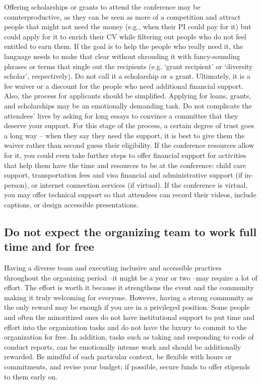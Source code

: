 \documentclass[10pt,letterpaper]{article}
\begin{document}
Offering scholarships or grants to attend the conference may be counterproductive, as they can be seen as more of a competition and attract people that might not need the money (e.g., when their PI could pay for it) but could apply for it to enrich their CV while filtering out people who do not feel entitled to earn them. If the goal is to help the people who really need it, the language needs to make that clear without shrouding it with fancy-sounding phrases or terms that single out the recipients (e.g. `grant recipient' or `diversity scholar', respectively). Do not call it a scholarship or a grant. Ultimately, it is a fee waiver or a discount for the people who need additional financial support. Also, the process for applicants should be simplified. Applying for loans, grants, and scholarships may be an emotionally demanding task. Do not complicate the attendees' lives by asking for long essays to convince a committee that they deserve your support. For this stage of the process, a certain degree of trust goes a long way -- when they say they need the support, it is best to give them the waiver rather than second guess their eligibility. If the conference resources allow for it, you could even take further steps to offer financial support for activities that help them have the time and resources to be at the conference: child care support, transportation fees and visa financial and administrative support (if in-person), or internet connection services (if virtual). If the conference is virtual, you may offer technical support so that attendees can record their videos, include captions, or design accessible presentations.

\subsection{Do not expect the organizing team to work full time and for free}
\label{rule_pay_team}
Having a diverse team and executing inclusive and accessible practices throughout the organizing period --it might be a year or two --may require a lot of effort. The effort is worth it because it strengthens the event and the community making it truly welcoming for everyone. However, having a strong community as the only reward may be enough if you are in a privileged position. Some people and often the minoritized ones do not have institutional support to put time and effort into the organization tasks and do not have the luxury to commit to the organization for free. In addition, tasks such as taking and responding to code of conduct reports, can be emotionally intense work and should be additionally rewarded. Be mindful of each particular context, be flexible with hours or commitments, and revise your budget; if possible, secure funds to offer stipends to them early on. 
\end{document}
